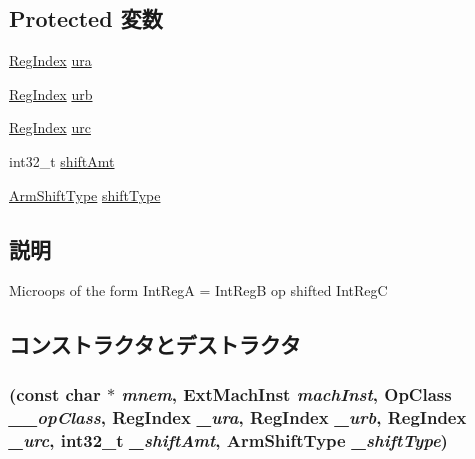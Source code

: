 \subsection*{Protected 変数}
\begin{DoxyCompactItemize}
\item 
\hyperlink{classStaticInst_a36d25e03e43fa3bb4c5482cbefe5e0fb}{RegIndex} \hyperlink{classArmISA_1_1MicroIntRegOp_a8e6cd3e234a4950e7a1a05f1b24cfee0}{ura}
\item 
\hyperlink{classStaticInst_a36d25e03e43fa3bb4c5482cbefe5e0fb}{RegIndex} \hyperlink{classArmISA_1_1MicroIntRegOp_a3771d4e6da84a09dbf436d6b1af2be46}{urb}
\item 
\hyperlink{classStaticInst_a36d25e03e43fa3bb4c5482cbefe5e0fb}{RegIndex} \hyperlink{classArmISA_1_1MicroIntRegOp_a7b2bf3346575e8b24bdd921acf571967}{urc}
\item 
int32\_\-t \hyperlink{classArmISA_1_1MicroIntRegOp_a378dfadeb317c390962c147be928d92d}{shiftAmt}
\item 
\hyperlink{namespaceArmISA_a209d79feaaef0aa2f54ae62e53ee90de}{ArmShiftType} \hyperlink{classArmISA_1_1MicroIntRegOp_ae5b7df4bd366c5419743bf5f679485b9}{shiftType}
\end{DoxyCompactItemize}


\subsection{説明}
Microops of the form IntRegA = IntRegB op shifted IntRegC 

\subsection{コンストラクタとデストラクタ}
\hypertarget{classArmISA_1_1MicroIntRegOp_afdd1f2b049ef59e4297a31709dc79a88}{
\subsubsection[{MicroIntRegOp}]{ (const char $\ast$ {\em mnem}, \/  {\bf ExtMachInst} {\em machInst}, \/  OpClass {\em \_\-\_\-opClass}, \/  {\bf RegIndex} {\em \_\-ura}, \/  {\bf RegIndex} {\em \_\-urb}, \/  {\bf RegIndex} {\em \_\-urc}, \/  int32\_\-t {\em \_\-shiftAmt}, \/  {\bf ArmShiftType} {\em \_\-shiftType})}}
\label{classArmISA_1_1MicroIntRegOp_afdd1f2b049ef59e4297a31709dc79a88}



